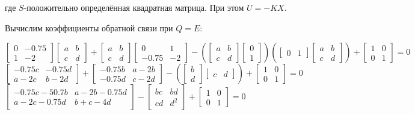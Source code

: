 \documentclass[14pt,a4paper,report]{report}
\begin{document}
где $S$-положительно определённая квадратная матрица. При этом $U=-KX$.

Вычислим коэффициенты обратной связи при $Q=E$:

\begin{center}
	$\begin{bmatrix} 0 & -0.75 \\ 1 & -2 \end{bmatrix}
	\begin{bmatrix} a & b \\ c & d \end{bmatrix}+
	\begin{bmatrix} a & b \\ c & d \end{bmatrix}
	\begin{bmatrix} 0 & 1 \\ -0.75 & -2 \end{bmatrix}-
	(\begin{bmatrix} a & b \\ c & d \end{bmatrix}
	\begin{bmatrix} 0 \\ 1 \end{bmatrix})
	(\begin{bmatrix} 0 & 1 \end{bmatrix}
	\begin{bmatrix} a & b \\ c & d \end{bmatrix})+
	\begin{bmatrix} 1 & 0 \\ 0 & 1 \end{bmatrix}=0$\\
	$\begin{bmatrix} -0.75c & -0.75d \\ a-2c & b-2d \end{bmatrix}+
	\begin{bmatrix} -0.75b & a-2b \\ -0.75d & c-2d \end{bmatrix}-
	(\begin{bmatrix} b \\ d \end{bmatrix}
	\begin{bmatrix} c & d \end{bmatrix})+
	\begin{bmatrix} 1 & 0 \\ 0 & 1 \end{bmatrix}=0$\\
	$\begin{bmatrix} -0.75c-50.7b & a-2b-0.75d \\ a-2c-0.75d & b+c-4d \end{bmatrix}-
	\begin{bmatrix} bc & bd \\ cd & d^2 \end{bmatrix}+
	\begin{bmatrix} 1 & 0 \\ 0 & 1 \end{bmatrix}=0$
\end{center}
\end{document}
